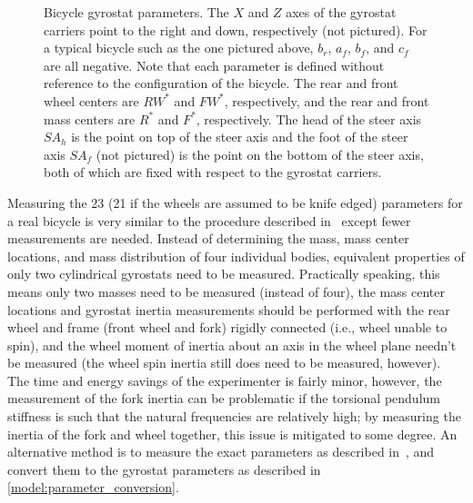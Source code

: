 \begin{figure}[htbp]
  \caption[Bicycle gyrostat parameters.]{Bicycle gyrostat parameters. The $X$
    and $Z$ axes of the gyrostat carriers point to the right and down,
    respectively (not pictured). For a typical bicycle such as the one pictured
    above, $b_r$, $a_f$, $b_f$, and $c_f$ are all negative. Note that each
    parameter is defined without reference to the configuration of the bicycle.
    The rear and front wheel centers are $RW^*$ and $FW^*$, respectively, and
    the rear and front mass centers are $R^*$ and $F^*$, respectively.  The
    head of the steer axis $SA_h$ is the point on top of the steer axis and the
    foot of the steer axis $SA_f$ (not pictured) is the point on the bottom of the
    steer axis, both of which are fixed with respect to the gyrostat carriers.}
\label{model:fig:bicycle}
\end{figure}

Measuring the 23 (21 if the wheels are assumed to be knife edged) parameters
for a real bicycle is very similar to the procedure described
in~\cite{Moore2010b} except fewer measurements are needed. Instead of
determining the mass, mass center locations, and mass distribution of four
individual bodies, equivalent properties of only two cylindrical gyrostats need
to be measured. Practically speaking, this means only two masses need to be
measured (instead of four), the mass center locations and gyrostat inertia
measurements should be performed with the rear wheel and frame (front wheel and
fork) rigidly connected (i.e., wheel unable to spin), and the wheel moment of
inertia about an axis in the wheel plane needn't be measured (the wheel spin
inertia still does need to be measured, however). The time and energy savings
of the experimenter is fairly minor, however, the measurement of the fork
inertia can be problematic if the torsional pendulum stiffness is such that the
natural frequencies are relatively high; by measuring the inertia of the fork
and wheel together, this issue is mitigated to some degree. An alternative
method is to measure the exact parameters as described in~\cite{Moore2010b},
and convert them to the gyrostat parameters as described in
\autoref{model:parameter_conversion}.

